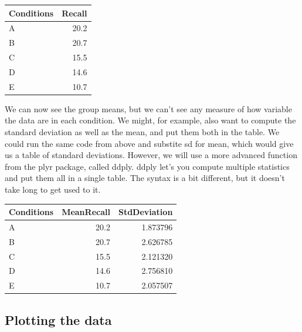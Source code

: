 \begin{tabular}{l|r}
\hline
Conditions & Recall\\
\hline
A & 20.2\\
\hline
B & 20.7\\
\hline
C & 15.5\\
\hline
D & 14.6\\
\hline
E & 10.7\\
\hline
\end{tabular}

We can now see the group means, but we can't see any measure of how
variable the data are in each condition. We might, for example, also
want to compute the standard deviation as well as the mean, and put them
both in the table. We could run the same code from above and substite sd
for mean, which would give us a table of standard deviations. However,
we will use a more advanced function from the plyr package, called
ddply. ddply let's you compute multiple statistics and put them all in a
single table. The syntax is a bit different, but it doesn't take long to
get used to it.

\begin{Shaded}
\begin{Highlighting}[]
\NormalTok{)}
\end{Highlighting}
\end{Shaded}

\begin{tabular}{l|r|r}
\hline
Conditions & MeanRecall & StdDeviation\\
\hline
A & 20.2 & 1.873796\\
\hline
B & 20.7 & 2.626785\\
\hline
C & 15.5 & 2.121320\\
\hline
D & 14.6 & 2.756810\\
\hline
E & 10.7 & 2.057507\\
\hline
\end{tabular}

\subsection{Plotting the data}\label{plotting-the-data}

